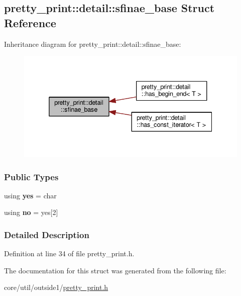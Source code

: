 \hypertarget{structpretty__print_1_1detail_1_1sfinae__base}{}\subsection{pretty\+\_\+print\+:\+:detail\+:\+:sfinae\+\_\+base Struct Reference}
\label{structpretty__print_1_1detail_1_1sfinae__base}


Inheritance diagram for pretty\+\_\+print\+:\+:detail\+:\+:sfinae\+\_\+base\+:
\nopagebreak
\begin{figure}[H]
\begin{center}
\leavevmode
\includegraphics[width=338pt]{structpretty__print_1_1detail_1_1sfinae__base__inherit__graph}
\end{center}
\end{figure}
\subsubsection*{Public Types}
\begin{DoxyCompactItemize}
\item 
using {\bfseries yes} = char\hypertarget{structpretty__print_1_1detail_1_1sfinae__base_ab2562401cc1ef39e800d952786129009}{}\label{structpretty__print_1_1detail_1_1sfinae__base_ab2562401cc1ef39e800d952786129009}

\item 
using {\bfseries no} = yes\mbox{[}2\mbox{]}\hypertarget{structpretty__print_1_1detail_1_1sfinae__base_ab8ea87e476a507db1f9a3b50672f08ff}{}\label{structpretty__print_1_1detail_1_1sfinae__base_ab8ea87e476a507db1f9a3b50672f08ff}

\end{DoxyCompactItemize}


\subsubsection{Detailed Description}


Definition at line 34 of file pretty\+\_\+print.\+h.



The documentation for this struct was generated from the following file\+:\begin{DoxyCompactItemize}
\item 
core/util/outside1/\hyperlink{pretty__print_8h}{pretty\+\_\+print.\+h}\end{DoxyCompactItemize}
